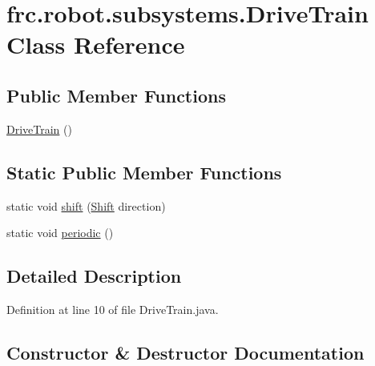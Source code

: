 \hypertarget{classfrc_1_1robot_1_1subsystems_1_1DriveTrain}{}\section{frc.\+robot.\+subsystems.\+Drive\+Train Class Reference}
\label{classfrc_1_1robot_1_1subsystems_1_1DriveTrain}
\subsection*{Public Member Functions}
\begin{DoxyCompactItemize}
\item 
\hyperlink{classfrc_1_1robot_1_1subsystems_1_1DriveTrain_a39f30717e8df92af73d57c01ac0525df}{Drive\+Train} ()
\end{DoxyCompactItemize}
\subsection*{Static Public Member Functions}
\begin{DoxyCompactItemize}
\item 
static void \hyperlink{classfrc_1_1robot_1_1subsystems_1_1DriveTrain_a3288b5af8182d08f76290b257041538c}{shift} (\hyperlink{enumfrc_1_1robot_1_1Enums_1_1Shift}{Shift} direction)
\item 
static void \hyperlink{classfrc_1_1robot_1_1subsystems_1_1DriveTrain_a883baac3715e22887c0ec5ce825fbfab}{periodic} ()
\end{DoxyCompactItemize}


\subsection{Detailed Description}


Definition at line 10 of file Drive\+Train.\+java.



\subsection{Constructor \& Destructor Documentation}
\mbox{\label{classfrc_1_1robot_1_1subsystems_1_1DriveTrain_a39f30717e8df92af73d57c01ac0525df}} 
